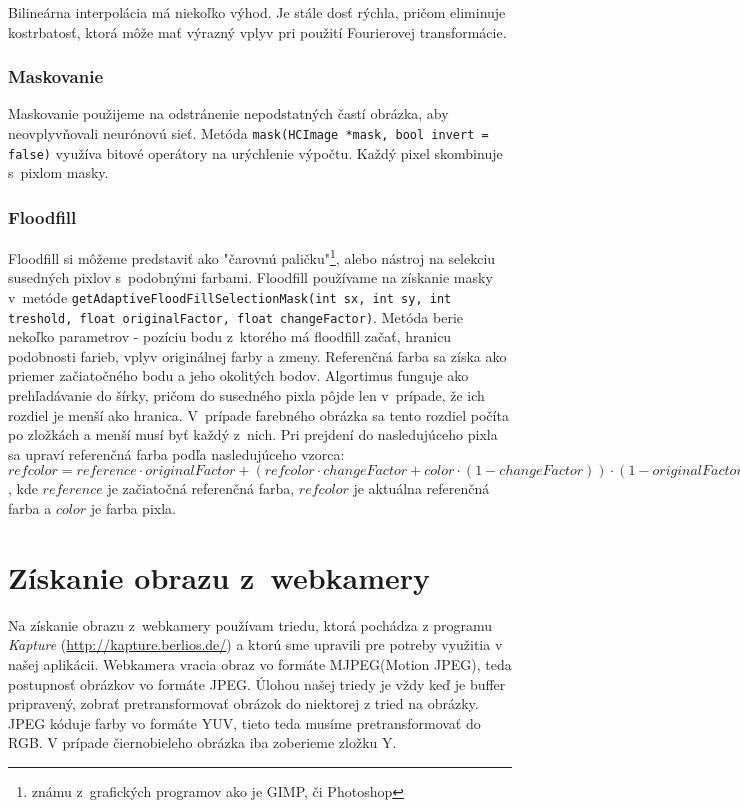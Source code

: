 Bilineárna interpolácia má niekoľko výhod. Je stále dosť rýchla, pričom eliminuje kostrbatosť, ktorá môže mať výrazný vplyv pri použití Fourierovej transformácie.

\subsubsection{Maskovanie}
Maskovanie použijeme na odstránenie nepodstatných častí obrázka, aby neovplyvňovali neurónovú sieť. Metóda {\tt mask(HCImage *mask, bool invert = false)} využíva bitové operátory na urýchlenie výpočtu. Každý pixel skombinuje s~pixlom masky. 

\subsubsection{Floodfill}
Floodfill si môžeme predstaviť ako "čarovnú paličku"\footnote{známu z~grafických programov ako je GIMP, či Photoshop}, alebo nástroj na selekciu susedných pixlov s~podobnými farbami. Floodfill používame na získanie masky v~metóde {\tt getAdaptiveFloodFillSelectionMask(int sx, int sy, int treshold, float originalFactor, float changeFactor)}. Metóda berie nekoľko parametrov - pozíciu bodu z~ktorého má floodfill začať, hranicu podobnosti farieb, vplyv originálnej farby a zmeny. Referenčná farba sa získa ako priemer začiatočného bodu a jeho okolitých bodov. Algortimus funguje ako prehľadávanie do šírky, pričom do susedného pixla pôjde len v~prípade, že ich rozdiel je menší ako hranica. V~prípade farebného obrázka sa tento rozdiel počíta po zložkách a menší musí byť každý z~nich. Pri prejdení do nasledujúceho pixla sa upraví referenčná farba podľa nasledujúceho vzorca: $refcolor = reference \cdot originalFactor + (refcolor\cdot changeFactor+color \cdot (1-changeFactor)) \cdot (1-originalFactor)$, kde $reference$ je začiatočná referenčná farba, $refcolor$ je aktuálna referenčná farba a $color$ je farba pixla.

\section{Získanie obrazu z~webkamery}
Na získanie obrazu z~webkamery používam triedu, ktorá pochádza z programu \textit{Kapture} (\url{http://kapture.berlios.de/}) a ktorú sme upravili pre potreby využitia v našej aplikácii. Webkamera vracia obraz vo formáte MJPEG(Motion JPEG), teda postupnosť obrázkov vo formáte JPEG. Úlohou našej triedy je vždy keď je buffer pripravený, zobrať pretransformovať obrázok do niektorej z tried na obrázky. JPEG kóduje farby vo formáte YUV, tieto teda musíme pretransformovať do RGB. V prípade čiernobieleho obrázka iba zoberieme zložku Y.

